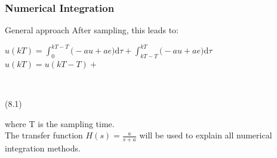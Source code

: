 \begin{frame}
	\frametitle{Numerical Integration}
	\begin{block}{General approach}
		After sampling, this leads to:
		\begin{center}
			$u(kT) = \int_0^{kT -T} \big(-au + ae \big)\mathrm{d}\tau + \int_{kT - T}^{kT} \big(-au + ae \big)\mathrm{d}\tau$
			$u(kT) = u(kT - T)+ $ 
			\begin{cases}
				\\
			\end{cases}
			(8.1)
		\end{center}
		where T is the sampling time.\\
		\vspace{1em}
		The transfer function $H(s) = \frac{a}{s + a}$ will be used to explain all numerical integration methods.
	\end{block}
\end{frame}

